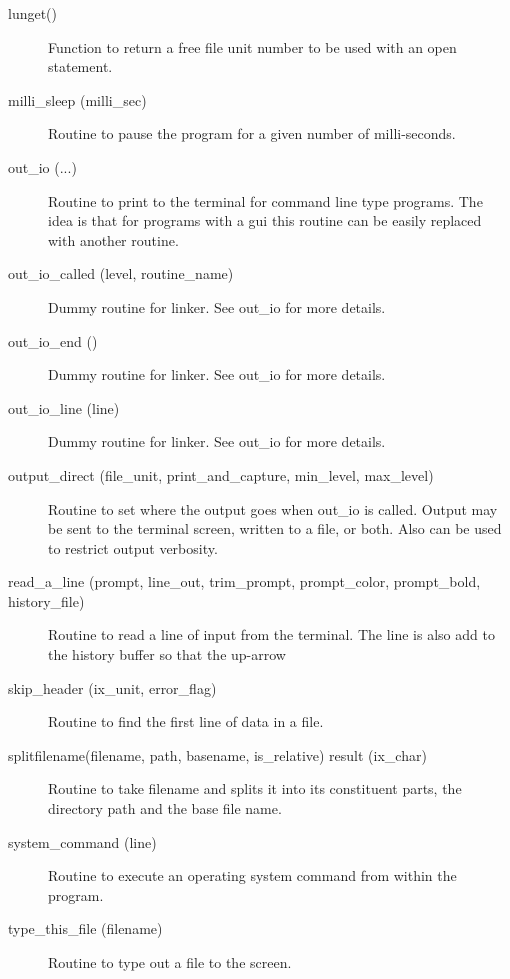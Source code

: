 \begin{description}
\label{r:lunget}
\item[lunget()] \Newline 
Function to return a free file unit number to be used with an open statement.

\label{r:milli.sleep}
\item[milli_sleep (milli_sec)] \Newline 
Routine to pause the program for a given number of milli-seconds.

\label{r:out.io}
\item[out_io (...)] \Newline 
Routine to print to the terminal for command line type programs.
The idea is that for programs with a gui this routine can be easily
replaced with another routine.

\label{r:out.io.called}
\item[out_io_called (level, routine_name)] \Newline 
Dummy routine for linker.
See out_io for more details.

\label{r:out.io.end}
\item[out_io_end ()] \Newline 
Dummy routine for linker.
See out_io for more details.

\label{r:out.io.line}
\item[out_io_line (line)] \Newline 
Dummy routine for linker.
See out_io for more details.

\label{r:output.direct}
\item[output_direct (file_unit, print_and_capture, min_level, max_level)] \Newline 
Routine to set where the output goes when out_io is called.
Output may be sent to the terminal screen, written to a file, or both.
Also can be used to restrict output verbosity.

\label{r:read.a.line}
\item[read_a_line (prompt, line_out, trim_prompt, prompt_color, prompt_bold, history_file)] \Newline 
Routine to read a line of input from the terminal.
The line is also add to the history buffer so that the up-arrow

\label{r:skip.header}
\item[skip_header (ix_unit, error_flag)] \Newline 
Routine to find the first line of data in a file. 

\label{r:splitfilename}
\item[splitfilename(filename, path, basename, is_relative) result (ix_char)] \Newline 
Routine to take filename and splits it into its constituent parts, 
the directory path and the base file name.  

\label{r:system.command}
\item[system_command (line)] \Newline 
Routine to execute an operating system command from within the program.

\label{r:type.this.file}
\item[type_this_file (filename)] \Newline 
Routine to type out a file to the screen.

\end{description}

